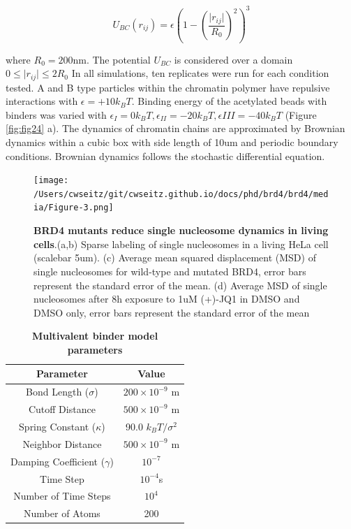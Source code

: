 \begin{equation}
U_{BC}\left(r_{ij}\right)=\epsilon\left(1-\left(\frac{\lvert r_{ij}\lvert}{R_0}\right)^2\right)^3
\end{equation}

where $R_0=200$nm. The potential $U_{BC}$ is considered over a domain $0\leq\lvert r_{ij}\lvert\leq 2 R_0$ In all simulations, ten replicates were run for each condition tested. A and B type particles within the chromatin polymer have repulsive interactions with $\epsilon = +10k_{B}T$. Binding energy of the acetylated beads with binders was varied with $\epsilon_{I} = 0 k_{B}T,\epsilon_{II} = -20k_{B}T,\epsilon{III}=-40k_{B}T$ (Figure \ref{fig:fig24} a). The dynamics of chromatin chains are approximated by Brownian dynamics within a cubic box with side length of 10um and periodic boundary conditions. Brownian dynamics follows the stochastic differential equation.

\begin{figure}[t]
\texttt{[image: /Users/cwseitz/git/cwseitz.github.io/docs/phd/brd4/brd4/media/Figure-3.png]}
\caption{\textbf{BRD4 mutants reduce single nucleosome dynamics in living cells}.(a,b) Sparse labeling of single nucleosomes in a living HeLa cell (scalebar 5um). (c) Average mean squared displacement (MSD) of single nucleosomes for wild-type and mutated BRD4, error bars represent the standard error of the mean. (d) Average MSD of single nucleosomes after 8h exposure to 1uM (+)-JQ1 in DMSO and DMSO only, error bars represent the standard error of the mean}
\label{fig:fig26}
\end{figure}

\begin{table}[h!]
\centering
\begin{tabular}{|c|c|}
\hline
\textbf{Parameter} & \textbf{Value} \\ \hline
Bond Length ($\sigma$) & $200 \times 10^{-9}$ m \\ \hline
Cutoff Distance & $500 \times 10^{-9}$ m \\ \hline
Spring Constant ($\kappa$) & 90.0 $k_{B}T/\sigma^2$ \\ \hline
Neighbor Distance & $500 \times 10^{-9}$ m \\ \hline
Damping Coefficient ($\gamma$) & $10^{-7}$ \\ \hline
Time Step & $10^{-4}$s\\ \hline
Number of Time Steps & $10^4$ \\ \hline
Number of Atoms & 200 \\ \hline
\end{tabular}
\caption{\textbf{Multivalent binder model parameters}}
\end{table}


